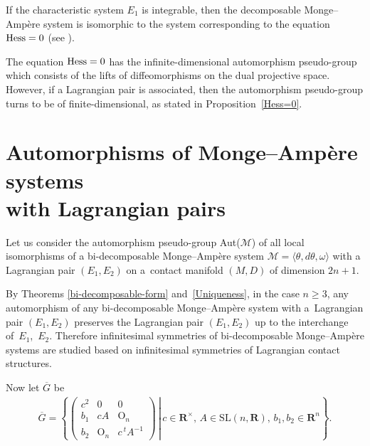\documentclass[pdftex]{sigma}
\begin{document}
\begin{Rem}
If the characteristic system $E_1$ is integrable, then the decomposable Monge--Amp{\`e}re system
is isomorphic to the system corresponding to the equation ${\rm Hess} = 0$ (see \cite{M-M,Mo2}).
\end{Rem}

\begin{Rem}
The equation ${\rm Hess} = 0$ has the inf\/inite-dimensional automorphism pseudo-group
which consists of the lifts of dif\/feomorphisms on the dual projective space.
However, if a Lagrangian pair is associated, then the automorphism pseudo-group
turns to be of f\/inite-dimensional, as stated in Proposition~\ref{Hess=0}.
\end{Rem}


\section[Automorphisms of Monge-Amp{\`e}re systems with Lagrangian pairs]{Automorphisms of Monge--Amp{\`e}re systems\\ with Lagrangian pairs}
\label{Automorphisms}

Let us consider the automorphism pseudo-group Aut($\mathcal{M}$) of
all local isomorphisms of a bi-decomposable Monge--Amp{\`e}re system
$\mathcal{M} = \langle \theta, d\theta, \omega \rangle$
with a Lagrangian pair $(E_1,E_2)$
on a~contact manifold $(M,D)$ of dimension $2n+1$.

By Theorems \ref{bi-decomposable-form} and~\ref{Uniqueness}, in the case $n \geq 3$,
any automorphism of any bi-decomposable Monge--Amp{\`e}re system with a~Lagrangian pair $(E_1, E_2)$ preserves the Lagrangian pair $(E_1, E_2)$
up to the interchange of~$E_1$,~$E_2$.
Therefore inf\/initesimal symmetries
of bi-decom\-po\-sable Monge--Amp{\`e}re systems
are studied based on inf\/initesimal symmetries of Lagrangian contact structures.

Now let $\overline{G}$ be
\begin{gather*}
\overline{G} = \left\{\left. \begin{pmatrix}
                       c^2 & 0 & 0 \\
                        b_1 & cA &   \mathrm{O}_n \\
                        b_2 &   \mathrm{O}_n &   c\, {}^t\!\! A^{-1}
                    \end{pmatrix}
                    \, \right\vert \,
c \in {\mathbf{R}}^{\times}, \,A\in \mathrm{SL}(n,{\mathbf{R}}),\, b_1, b_2 \in {\mathbf{R}}^n
\right\}.
\end{gather*}
\end{document}
